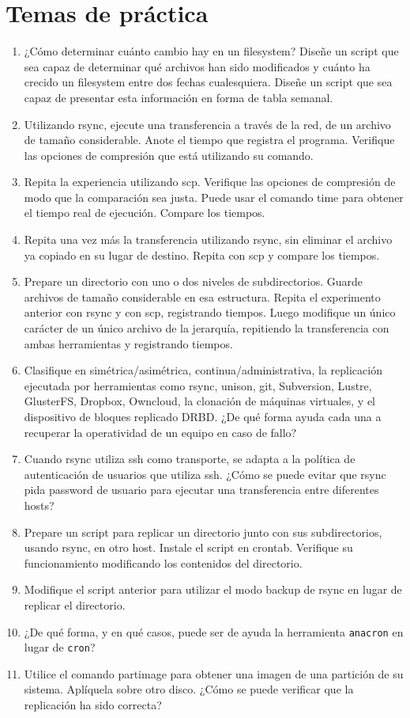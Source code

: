 \section{Temas de práctica}
\begin{enumerate}
	\item ¿Cómo determinar cuánto cambio hay en un filesystem? Diseñe un script que sea capaz de determinar qué archivos han sido modificados y cuánto ha crecido un filesystem entre dos fechas cualesquiera. Diseñe un script que sea capaz de presentar esta información en forma de tabla semanal. 
	\item Utilizando rsync, ejecute una transferencia a través de la red, de un archivo de tamaño considerable. Anote el tiempo que registra el programa. Verifique las opciones de compresión que está utilizando su comando.
	\item Repita la experiencia utilizando scp. Verifique las opciones de compresión de modo que la comparación sea justa. Puede usar el comando time para obtener el tiempo real de ejecución. Compare los tiempos. 
	\item Repita una vez más la transferencia utilizando rsync, sin eliminar el archivo ya copiado en su lugar de destino. Repita con scp y compare los tiempos.
	\item Prepare un directorio con uno o dos niveles de subdirectorios. Guarde archivos de tamaño considerable en esa estructura. Repita el experimento anterior con rsync y con scp, registrando tiempos. Luego modifique un único carácter de un único archivo de la jerarquía, repitiendo la transferencia con ambas herramientas y registrando tiempos.
	\item Clasifique en simétrica/asimétrica, continua/administrativa, la replicación ejecutada por herramientas como rsync, unison, git, Subversion, Lustre, GlusterFS, Dropbox, Owncloud, la clonación de máquinas virtuales, y el dispositivo de bloques replicado DRBD. ¿De qué forma ayuda cada una a recuperar la operatividad de un equipo en caso de fallo?	
	\item Cuando rsync utiliza ssh como transporte, se adapta a la política de autenticación de usuarios que utiliza ssh. ¿Cómo se puede evitar que rsync pida password de usuario para ejecutar una transferencia entre diferentes hosts?
	\item Prepare un script para replicar un directorio junto con sus subdirectorios, usando rsync, en otro host. Instale el script en crontab. Verifique su funcionamiento modificando los contenidos del directorio.
	\item Modifique el script anterior para utilizar el modo backup de rsync en lugar de replicar el directorio.
	\item ¿De qué forma, y en qué casos, puede ser de ayuda la herramienta \lstinline$anacron$ en lugar de \lstinline$cron$? 
	\item Utilice el comando partimage para obtener una imagen de una partición de su sistema. Aplíquela sobre otro disco. ¿Cómo se puede verificar que la replicación ha sido correcta? 
\end{enumerate}
